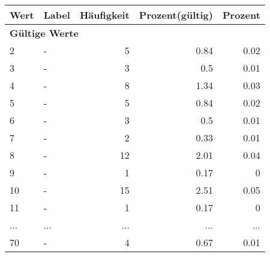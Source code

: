      \begin{longtable}{lXrrr}
     \toprule
     \textbf{Wert} & \textbf{Label} & \textbf{Häufigkeit} & \textbf{Prozent(gültig)} & \textbf{Prozent} \\
     \endhead
     \midrule
     \multicolumn{5}{l}{\textbf{Gültige Werte}}\\
        2 & \multicolumn{1}{X}{-} & %
          \num{5} &
          \num[round-mode=places,round-precision=2]{0,84} &
          \num[round-mode=places,round-precision=2]{0,02} \\
        3 & \multicolumn{1}{X}{-} & %
          \num{3} &
          \num[round-mode=places,round-precision=2]{0,5} &
          \num[round-mode=places,round-precision=2]{0,01} \\
        4 & \multicolumn{1}{X}{-} & %
          \num{8} &
          \num[round-mode=places,round-precision=2]{1,34} &
          \num[round-mode=places,round-precision=2]{0,03} \\
        5 & \multicolumn{1}{X}{-} & %
          \num{5} &
          \num[round-mode=places,round-precision=2]{0,84} &
          \num[round-mode=places,round-precision=2]{0,02} \\
        6 & \multicolumn{1}{X}{-} & %
          \num{3} &
          \num[round-mode=places,round-precision=2]{0,5} &
          \num[round-mode=places,round-precision=2]{0,01} \\
        7 & \multicolumn{1}{X}{-} & %
          \num{2} &
          \num[round-mode=places,round-precision=2]{0,33} &
          \num[round-mode=places,round-precision=2]{0,01} \\
        8 & \multicolumn{1}{X}{-} & %
          \num{12} &
          \num[round-mode=places,round-precision=2]{2,01} &
          \num[round-mode=places,round-precision=2]{0,04} \\
        9 & \multicolumn{1}{X}{-} & %
          \num{1} &
          \num[round-mode=places,round-precision=2]{0,17} &
          \num[round-mode=places,round-precision=2]{0} \\
        10 & \multicolumn{1}{X}{-} & %
          \num{15} &
          \num[round-mode=places,round-precision=2]{2,51} &
          \num[round-mode=places,round-precision=2]{0,05} \\
        11 & \multicolumn{1}{X}{-} & %
          \num{1} &
          \num[round-mode=places,round-precision=2]{0,17} &
          \num[round-mode=places,round-precision=2]{0} \\
       ... & ... & ... & ... & ... \\
        70 & \multicolumn{1}{X}{-} & %
          \num{4} &
          \num[round-mode=places,round-precision=2]{0,67} &
          \num[round-mode=places,round-precision=2]{0,01} \\


\end{longtable}
